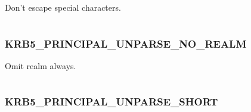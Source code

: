 \documentclass[letterpaper,10pt,english]{sphinxmanual}
\begin{document}
Don't escape special characters.

\begin{tabulary}{\linewidth}{|L|L|}
\hline

 & 
\\
\hline\end{tabulary}



\subsubsection{KRB5\_PRINCIPAL\_UNPARSE\_NO\_REALM}
\label{appdev/refs/macros/KRB5_PRINCIPAL_UNPARSE_NO_REALM:krb5-principal-unparse-no-realm}\label{appdev/refs/macros/KRB5_PRINCIPAL_UNPARSE_NO_REALM:krb5-principal-unparse-no-realm-data}\label{appdev/refs/macros/KRB5_PRINCIPAL_UNPARSE_NO_REALM::doc}

\begin{fulllineitems}
\label{appdev/refs/macros/KRB5_PRINCIPAL_UNPARSE_NO_REALM:KRB5_PRINCIPAL_UNPARSE_NO_REALM}
\end{fulllineitems}


Omit realm always.

\begin{tabulary}{\linewidth}{|L|L|}
\hline

 & 
\\
\hline\end{tabulary}



\subsubsection{KRB5\_PRINCIPAL\_UNPARSE\_SHORT}
\label{appdev/refs/macros/KRB5_PRINCIPAL_UNPARSE_SHORT::doc}\label{appdev/refs/macros/KRB5_PRINCIPAL_UNPARSE_SHORT:krb5-principal-unparse-short}\label{appdev/refs/macros/KRB5_PRINCIPAL_UNPARSE_SHORT:krb5-principal-unparse-short-data}

\begin{fulllineitems}
\label{appdev/refs/macros/KRB5_PRINCIPAL_UNPARSE_SHORT:KRB5_PRINCIPAL_UNPARSE_SHORT}
\end{fulllineitems}
\end{document}
